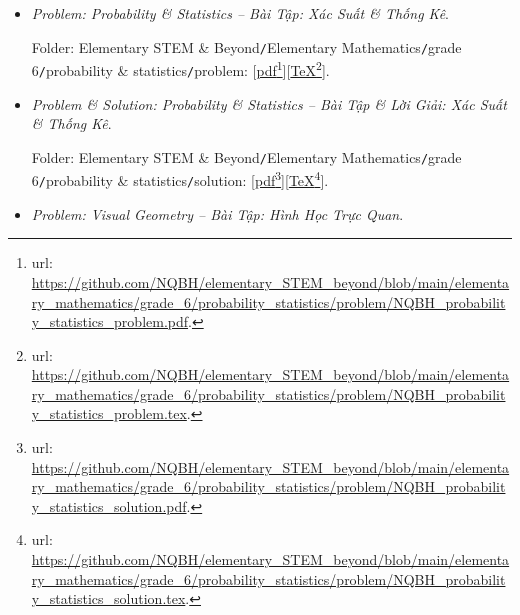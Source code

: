 \documentclass[12pt]{article}
\begin{document}
\begin{itemize}
	Folder: {\sf Elementary STEM \& Beyond{\tt/}Elementary Mathematics{\tt/}grade 6{\tt/}fraction, decimal{\tt/}solution}: [\href{https://github.com/NQBH/elementary_STEM_beyond/blob/main/elementary_mathematics/grade_6/fraction_decimal/solution/NQBH_fraction_decimal_solution.pdf}{pdf}\footnote{{\sc url}: \url{https://github.com/NQBH/elementary_STEM_beyond/blob/main/elementary_mathematics/grade_6/fraction_decimal/solution/NQBH_fraction_decimal_solution.pdf}.}][\href{https://github.com/NQBH/elementary_STEM_beyond/blob/main/elementary_mathematics/grade_6/fraction_decimal/solution/NQBH_fraction_decimal_solution.tex}{\TeX}\footnote{{\sc url}: \url{https://github.com/NQBH/elementary_STEM_beyond/blob/main/elementary_mathematics/grade_6/fraction_decimal/solution/NQBH_fraction_decimal_solution.tex}.}].
	\item {\it Problem: Probability {\it\&} Statistics -- Bài Tập: Xác Suất {\it\&} Thống Kê}.
	
	Folder: {\sf Elementary STEM \& Beyond{\tt/}Elementary Mathematics{\tt/}grade 6{\tt/}probability \& statistics{\tt/}problem}: [\href{https://github.com/NQBH/elementary_STEM_beyond/blob/main/elementary_mathematics/grade_6/probability_statistics/problem/NQBH_probability_statistics_problem.pdf}{pdf}\footnote{{\sc url}: \url{https://github.com/NQBH/elementary_STEM_beyond/blob/main/elementary_mathematics/grade_6/probability_statistics/problem/NQBH_probability_statistics_problem.pdf}.}][\href{https://github.com/NQBH/elementary_STEM_beyond/blob/main/elementary_mathematics/grade_6/probability_statistics/problem/NQBH_probability_statistics_problem.tex}{\TeX}\footnote{{\sc url}: \url{https://github.com/NQBH/elementary_STEM_beyond/blob/main/elementary_mathematics/grade_6/probability_statistics/problem/NQBH_probability_statistics_problem.tex}.}].
	\item {\it Problem \& Solution: Probability {\it\&} Statistics -- Bài Tập \& Lời Giải: Xác Suất {\it\&} Thống Kê}.
	
	Folder: {\sf Elementary STEM \& Beyond{\tt/}Elementary Mathematics{\tt/}grade 6{\tt/}probability \& statistics{\tt/}solution}: [\href{https://github.com/NQBH/elementary_STEM_beyond/blob/main/elementary_mathematics/grade_6/probability_statistics/problem/NQBH_probability_statistics_solution.pdf}{pdf}\footnote{{\sc url}: \url{https://github.com/NQBH/elementary_STEM_beyond/blob/main/elementary_mathematics/grade_6/probability_statistics/problem/NQBH_probability_statistics_solution.pdf}.}][\href{https://github.com/NQBH/elementary_STEM_beyond/blob/main/elementary_mathematics/grade_6/probability_statistics/problem/NQBH_probability_statistics_solution.tex}{\TeX}\footnote{{\sc url}: \url{https://github.com/NQBH/elementary_STEM_beyond/blob/main/elementary_mathematics/grade_6/probability_statistics/problem/NQBH_probability_statistics_solution.tex}.}].
	\item {\it Problem: Visual Geometry -- Bài Tập: Hình Học Trực Quan}.
	

\end{itemize}
\end{document}
